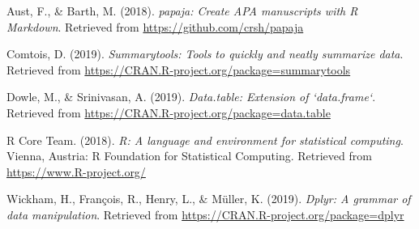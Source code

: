 \documentclass[man]{apa6}
\begin{document}
\hypertarget{refs}{}
\hypertarget{ref-R-papaja}{}
Aust, F., \& Barth, M. (2018). \emph{papaja: Create APA manuscripts with
R Markdown}. Retrieved from \url{https://github.com/crsh/papaja}

\hypertarget{ref-R-summarytools}{}
Comtois, D. (2019). \emph{Summarytools: Tools to quickly and neatly
summarize data}. Retrieved from
\url{https://CRAN.R-project.org/package=summarytools}

\hypertarget{ref-R-data.table}{}
Dowle, M., \& Srinivasan, A. (2019). \emph{Data.table: Extension of
`data.frame`}. Retrieved from
\url{https://CRAN.R-project.org/package=data.table}

\hypertarget{ref-R-base}{}
R Core Team. (2018). \emph{R: A language and environment for statistical
computing}. Vienna, Austria: R Foundation for Statistical Computing.
Retrieved from \url{https://www.R-project.org/}

\hypertarget{ref-R-dplyr}{}
Wickham, H., François, R., Henry, L., \& Müller, K. (2019). \emph{Dplyr:
A grammar of data manipulation}. Retrieved from
\url{https://CRAN.R-project.org/package=dplyr}

\endgroup
\end{document}
